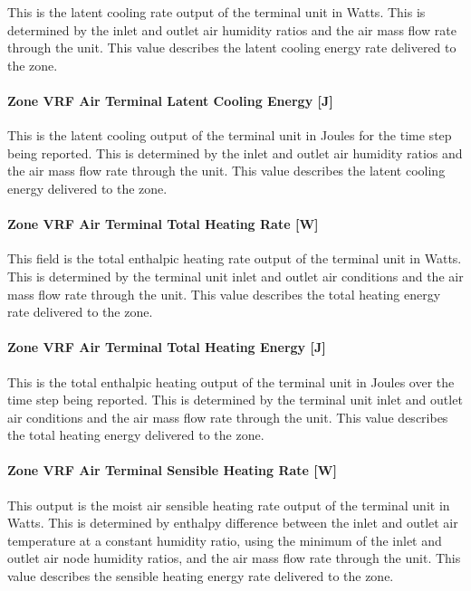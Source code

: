 This is the latent cooling rate output of the terminal unit in Watts. This is determined by the inlet and outlet air humidity ratios and the air mass flow rate through the unit. This value describes the latent cooling energy rate delivered to the zone.

\paragraph{Zone VRF Air Terminal Latent Cooling Energy {[}J{]}}\label{zone-vrf-air-terminal-latent-cooling-energy-j}

This is the latent cooling output of the terminal unit in Joules for the time step being reported. This is determined by the inlet and outlet air humidity ratios and the air mass flow rate through the unit. This value describes the latent cooling energy delivered to the zone.

\paragraph{Zone VRF Air Terminal Total Heating Rate {[}W{]}}\label{zone-vrf-air-terminal-total-heating-rate-w}

This field is the total enthalpic heating rate output of the terminal unit in Watts. This is determined by the terminal unit inlet and outlet air conditions and the air mass flow rate through the unit. This value describes the total heating energy rate delivered to the zone.

\paragraph{Zone VRF Air Terminal Total Heating Energy {[}J{]}}\label{zone-vrf-air-terminal-total-heating-energy-j}

This is the total enthalpic heating output of the terminal unit in Joules over the time step being reported. This is determined by the terminal unit inlet and outlet air conditions and the air mass flow rate through the unit. This value describes the total heating energy delivered to the zone.

\paragraph{Zone VRF Air Terminal Sensible Heating Rate {[}W{]}}\label{zone-vrf-air-terminal-sensible-heating-rate-w}

This output is the moist air sensible heating rate output of the terminal unit in Watts. This is determined by enthalpy difference between the inlet and outlet air temperature at a constant humidity ratio, using the minimum of the inlet and outlet air node humidity ratios, and the air mass flow rate through the unit. This value describes the sensible heating energy rate delivered to the zone.

